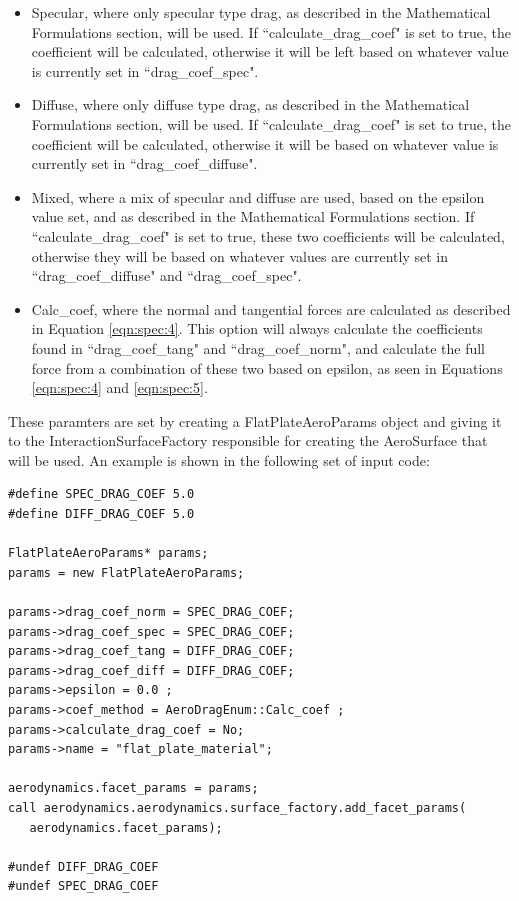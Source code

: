 \begin{itemize}
\item{Specular}, where only specular type drag, as described in the
Mathematical Formulations section, will be used. If ``calculate\_drag\_coef"
is set to true, the coefficient will be calculated, otherwise it will be left
based on whatever value is currently set in ``drag\_coef\_spec".
\item{Diffuse}, where only diffuse type drag, as described in the
Mathematical Formulations section, will be used. If ``calculate\_drag\_coef"
is set to true, the coefficient will be calculated, otherwise it will be
based on whatever value is currently set in ``drag\_coef\_diffuse".
\item{Mixed}, where a mix of specular and diffuse are used, based
on the epsilon value set, and as described in the Mathematical Formulations
section. If ``calculate\_drag\_coef" is set to true, these two
coefficients will be calculated, otherwise they will be based
on whatever values are currently set in ``drag\_coef\_diffuse" and
``drag\_coef\_spec".
\item{Calc\_coef}, where the normal and tangential forces
are calculated as described in Equation \eqref{eqn:spec:4}. This option
will always calculate the coefficients found in ``drag\_coef\_tang"
and ``drag\_coef\_norm", and calculate the full force from a combination of
these two based on epsilon, as seen in Equations \eqref{eqn:spec:4} and
\eqref{eqn:spec:5}.
\end{itemize}

These paramters are set by creating a FlatPlateAeroParams object and giving
it to the InteractionSurfaceFactory responsible for creating the
AeroSurface that will be used. An example is shown in the following
set of input code:

\begin{verbatim}
#define SPEC_DRAG_COEF 5.0
#define DIFF_DRAG_COEF 5.0

FlatPlateAeroParams* params;
params = new FlatPlateAeroParams;

params->drag_coef_norm = SPEC_DRAG_COEF;
params->drag_coef_spec = SPEC_DRAG_COEF;
params->drag_coef_tang = DIFF_DRAG_COEF;
params->drag_coef_diff = DIFF_DRAG_COEF;
params->epsilon = 0.0 ;
params->coef_method = AeroDragEnum::Calc_coef ;
params->calculate_drag_coef = No;
params->name = "flat_plate_material";

aerodynamics.facet_params = params;
call aerodynamics.aerodynamics.surface_factory.add_facet_params(
   aerodynamics.facet_params);

#undef DIFF_DRAG_COEF
#undef SPEC_DRAG_COEF

\end{verbatim}

